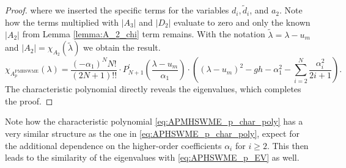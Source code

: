 \documentclass[a4paper, 11pt]{article}
\begin{document}
\begin{proof}
    where we inserted the specific terms for the variables $d_i, \widetilde{d}_i$, and $a_2$. Note how the terms multiplied with $|A_3|$ and $|D_2|$ evaluate to zero and only the known $|A_2|$ from Lemma \ref{lemma:A_2_chi} term remains.
    With the notation $\widetilde{\lambda} = \lambda - u_m$ and $|A_2| = \chi_{A_2}(\widetilde{\lambda})$ we obtain the result.
    \begin{equation*}
        \chi_{A^{\textrm{PMHSWME}}_{p}}(\lambda) = \frac{(-\alpha_1)^NN!}{(2N+1)!!} \cdot P^{'}_{N+1}\left(\frac{\lambda-u_m}{\alpha_1}\right) \cdot \left( \left( \lambda - u_m \right)^2 - gh - \alpha_1^2 - \sum\limits_{i=2}^N\frac{\alpha_i^2}{2i+1}\right).
    \end{equation*}
    The characteristic polynomial directly reveals the eigenvalues, which completes the proof.
\end{proof}

Note how the characteristic polynomial \eqref{eq:APMHSWME_p_char_poly} has a very similar structure as the one in \eqref{eq:APHSWME_p_char_poly}, expect for the additional dependence on the higher-order coefficients $\alpha_i$ for $i\geq2$. This then leads to the similarity of the eigenvalues with \eqref{eq:APHSWME_p_EV} as well.
\end{document}
